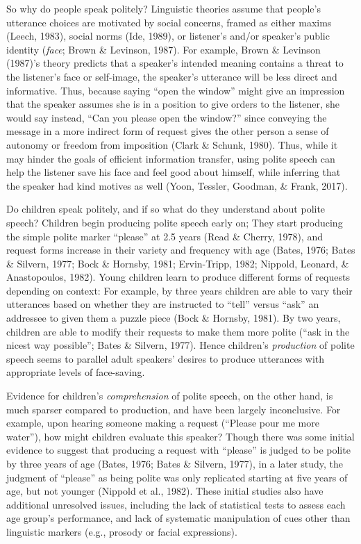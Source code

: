 \documentclass[10pt, letterpaper]{article}
\begin{document}
So why do people speak politely? Linguistic theories assume that
people's utterance choices are motivated by social concerns, framed as
either maxims (Leech, 1983), social norms (Ide, 1989), or listener's
and/or speaker's public identity (\emph{face}; Brown \& Levinson, 1987).
For example, Brown \& Levinson (1987)'s theory predicts that a speaker's
intended meaning contains a threat to the listener's face or self-image,
the speaker's utterance will be less direct and informative. Thus,
because saying ``open the window'' might give an impression that the
speaker assumes she is in a position to give orders to the listener, she
would say instead, ``Can you please open the window?'' since conveying
the message in a more indirect form of request gives the other person a
sense of autonomy or freedom from imposition (Clark \& Schunk, 1980).
Thus, while it may hinder the goals of efficient information transfer,
using polite speech can help the listener save his face and feel good
about himself, while inferring that the speaker had kind motives as well
(Yoon, Tessler, Goodman, \& Frank, 2017).

Do children speak politely, and if so what do they understand about
polite speech? Children begin producing polite speech early on; They
start producing the simple polite marker ``please'' at 2.5 years (Read
\& Cherry, 1978), and request forms increase in their variety and
frequency with age (Bates, 1976; Bates \& Silvern, 1977; Bock \&
Hornsby, 1981; Ervin-Tripp, 1982; Nippold, Leonard, \& Anastopoulos,
1982). Young children learn to produce different forms of requests
depending on context: For example, by three years children are able to
vary their utterances based on whether they are instructed to ``tell''
versus ``ask'' an addressee to given them a puzzle piece (Bock \&
Hornsby, 1981). By two years, children are able to modify their requests
to make them more polite (``ask in the nicest way possible''; Bates \&
Silvern, 1977). Hence children's \emph{production} of polite speech
seems to parallel adult speakers' desires to produce utterances with
appropriate levels of face-saving.

Evidence for children's \emph{comprehension} of polite speech, on the
other hand, is much sparser compared to production, and have been
largely inconclusive. For example, upon hearing someone making a request
(``Please pour me more water''), how might children evaluate this
speaker? Though there was some initial evidence to suggest that
producing a request with ``please'' is judged to be polite by three
years of age (Bates, 1976; Bates \& Silvern, 1977), in a later study,
the judgment of ``please'' as being polite was only replicated starting
at five years of age, but not younger (Nippold et al., 1982). These
initial studies also have additional unresolved issues, including the
lack of statistical tests to assess each age group's performance, and
lack of systematic manipulation of cues other than linguistic markers
(e.g., prosody or facial expressions).
\end{document}
